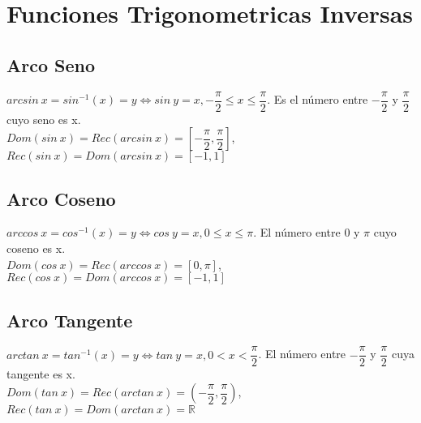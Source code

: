 \documentclass[11pt,a4paper]{article}
\begin{document}
\section{Funciones Trigonometricas Inversas}
\subsection{Arco Seno}
$arcsin\ x = sin^{-1}(x) = y \iff sin\ y = x, -\dfrac{\pi}{2} \leq x \leq \dfrac{\pi}{2}$. Es el n\'umero entre $-\dfrac{\pi}{2}$ y $\dfrac{\pi}{2}$ cuyo seno es x.\\

$Dom(sin\ x) = Rec(arcsin\ x) = [-\dfrac{\pi}{2}, \dfrac{\pi}{2}]$, $Rec(sin\ x) = Dom(arcsin\ x) = [-1,1]$

\subsection{Arco Coseno}
$arccos\ x = cos^{-1}(x) = y \iff cos\ y = x, 0 \leq x \leq \pi$. El n\'umero entre $0$ y $\pi$ cuyo coseno es x.\\

$Dom(cos\ x) = Rec(arccos\ x) = [0,\pi]$, $Rec(cos\ x) = Dom(arccos\ x) = [-1,1]$

\subsection{Arco Tangente}
$arctan\ x = tan^{-1}(x) = y \iff tan\ y = x, 0 < x < \dfrac{\pi}{2}$. El n\'umero entre $-\dfrac{\pi}{2}$ y $\dfrac{\pi}{2}$ cuya tangente es x.\\

$Dom(tan\ x) = Rec(arctan\ x) = (-\dfrac{\pi}{2}, \dfrac{\pi}{2})$, $Rec(tan\ x) = Dom(arctan\ x) = \mathbb{R}$
\end{document}

